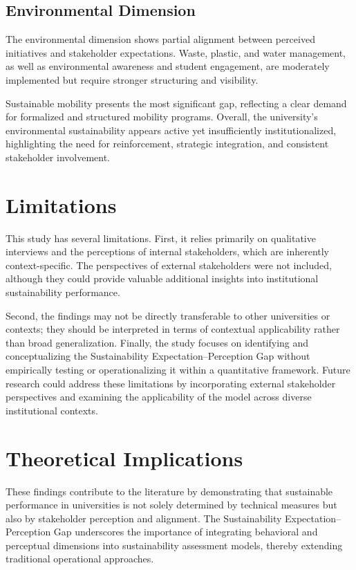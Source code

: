 \documentclass[12pt,a4paper]{article}
\begin{document}
\subsection{Environmental Dimension}

The environmental dimension shows partial alignment between perceived initiatives and stakeholder expectations. Waste, plastic, and water management, as well as environmental awareness and student engagement, are moderately implemented but require stronger structuring and visibility. 

Sustainable mobility presents the most significant gap, reflecting a clear demand for formalized and structured mobility programs. Overall, the university’s environmental sustainability appears active yet insufficiently institutionalized, highlighting the need for reinforcement, strategic integration, and consistent stakeholder involvement.

\section{Limitations}

This study has several limitations. First, it relies primarily on qualitative interviews and the perceptions of internal stakeholders, which are inherently context-specific. The perspectives of external stakeholders were not included, although they could provide valuable additional insights into institutional sustainability performance.

Second, the findings may not be directly transferable to other universities or contexts; they should be interpreted in terms of contextual applicability rather than broad generalization. Finally, the study focuses on identifying and conceptualizing the Sustainability Expectation--Perception Gap without empirically testing or operationalizing it within a quantitative framework. Future research could address these limitations by incorporating external stakeholder perspectives and examining the applicability of the model across diverse institutional contexts.

\section{Theoretical Implications}

These findings contribute to the literature by demonstrating that sustainable performance in universities is not solely determined by technical measures but also by stakeholder perception and alignment. The Sustainability Expectation--Perception Gap underscores the importance of integrating behavioral and perceptual dimensions into sustainability assessment models, thereby extending traditional operational approaches. 
\end{document}

